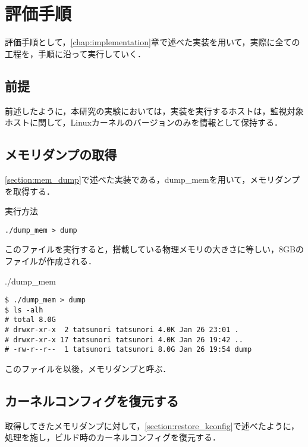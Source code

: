 \section{評価手順}
\label{section:eval}

評価手順として，\ref{chap:implementation}章で述べた実装を用いて，実際に全ての工程を，手順に沿って実行していく．

\subsection{前提}

前述したように，本研究の実験においては，実装を実行するホストは，監視対象ホストに関して，Linuxカーネルのバージョンのみを情報として保持する．

\subsection{メモリダンプの取得}
\label{subsection:eval_dump_mem}

\ref{section:mem_dump}で述べた実装である，dump_memを用いて，メモリダンプを取得する．

\begin{itembox}[l]{実行方法}
    \begin{verbatim}
./dump_mem > dump
    \end{verbatim}
\end{itembox}

このファイルを実行すると，搭載している物理メモリの大きさに等しい，8GBのファイルが作成される．

\begin{itembox}[l]{./dump_mem}
    \begin{verbatim}
$ ./dump_mem > dump
$ ls -alh
# total 8.0G
# drwxr-xr-x  2 tatsunori tatsunori 4.0K Jan 26 23:01 .
# drwxr-xr-x 17 tatsunori tatsunori 4.0K Jan 26 19:42 ..
# -rw-r--r--  1 tatsunori tatsunori 8.0G Jan 26 19:54 dump
    \end{verbatim}
\end{itembox}

このファイルを以後，メモリダンプと呼ぶ．

\subsection{カーネルコンフィグを復元する}
\label{subsection:eval_restore_kconfig}

取得してきたメモリダンプに対して，\ref{section:restore_kconfig}で述べたように，処理を施し，ビルド時のカーネルコンフィグを復元する．

